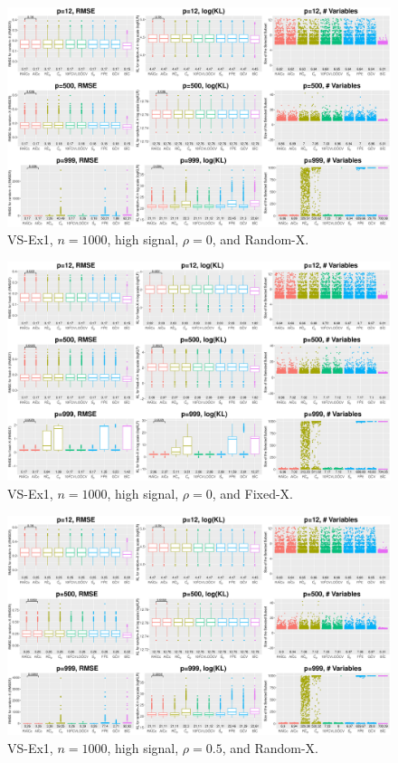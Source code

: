 \clearpage
\begin{figure}[!ht]
\centering
\includegraphics[width=\textwidth]{figures/supplement/randomx_VS-Ex1_n1000_hsnr_rho0.eps}
\caption{VS-Ex1, $n=1000$, high signal, $\rho=0$, and Random-X.}
\end{figure}
\begin{figure}[!ht]
\centering
\includegraphics[width=\textwidth]{figures/supplement/fixedx_VS-Ex1_n1000_hsnr_rho0.eps}
\caption{VS-Ex1, $n=1000$, high signal, $\rho=0$, and Fixed-X.}
\end{figure}
\clearpage
\begin{figure}[!ht]
\centering
\includegraphics[width=\textwidth]{figures/supplement/randomx_VS-Ex1_n1000_hsnr_rho05.eps}
\caption{VS-Ex1, $n=1000$, high signal, $\rho=0.5$, and Random-X.}
\end{figure}
